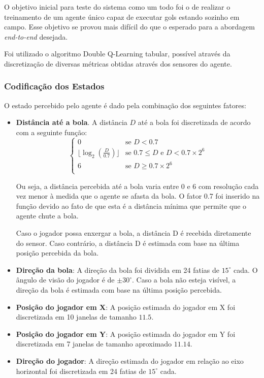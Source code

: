 O objetivo inicial para teste do sistema como um todo foi o de realizar o treinamento de um agente único capaz de executar gols estando sozinho em campo. Esse objetivo se provou mais difícil do que o esperado para a abordagem \textit{end-to-end} desejada.

Foi utilizado o algoritmo Double Q-Learning tabular, possível através da discretização de diversas métricas obtidas através dos sensores do agente.

\subsubsection{Codificação dos Estados}
\label{subsubsec:state-encoding}

O estado percebido pelo agente é dado pela combinação dos seguintes fatores:

\begin{itemize}
	\item \textbf{Distância até a bola}. A distância $D$ até a bola foi discretizada de acordo com a seguinte função:
	\begin{equation}
		\label{eq:balldist}
		\left\{
		\begin{array}{ll}
			0  & \mbox{se } D < 0.7 \\
			\lfloor\log_2 (\frac{D}{0.7})\rfloor & \mbox{se } 0.7 \leq D \mbox{ e } D < 0.7 \times 2^6 \\
			6  & \mbox{se } D \geq 0.7 \times 2^6 \\
			
		\end{array}
		\right.
	\end{equation}
	
	Ou seja, a distância percebida até a bola varia entre 0 e 6 com resolução cada vez menor à medida que o agente se afasta da bola. O fator 0.7 foi inserido na função devido ao fato de que esta é a distância mínima que permite que o agente chute a bola.
	
	Caso o jogador possa enxergar a bola, a distância D é recebida diretamente do sensor. Caso contrário, a distância D é estimada com base na última posição percebida da bola.
	
	\item \textbf{Direção da bola}: A direção da bola foi dividida em 24 fatias de $15^{\circ}$ cada. O ângulo de visão do jogador é de $\pm30^{\circ}$. Caso a bola não esteja visível, a direção da bola é estimada com base na última posição percebida.
	
	\item \textbf{Posição do jogador em X}: A posição estimada do jogador em X foi discretizada em 10 janelas de tamanho $11.5$.
	
	\item \textbf{Posição do jogador em Y}: A posição estimada do jogador em Y foi discretizada em 7 janelas de tamanho aproximado $11.14$.
	
	\item \textbf{Direção do jogador}: A direção estimada do jogador em relação ao eixo horizontal foi discretizada em 24 fatias de $15^{\circ}$ cada.
	
\end{itemize}

